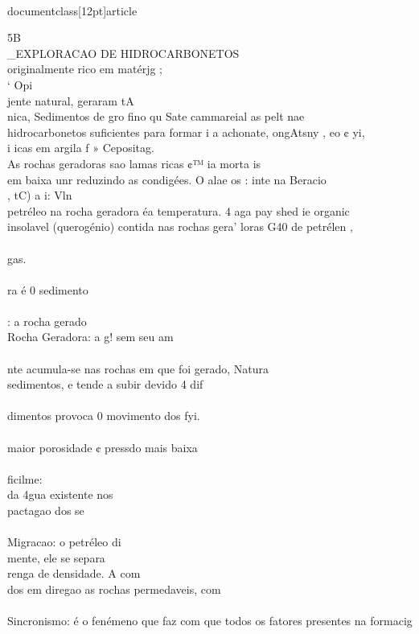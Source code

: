 \\documentclass[12pt]{article}
\begin{document}
{5B \\_EXPLORACAO DE HIDROCARBONETOS\\
originalmente rico em matérjg ;\\
‘ Opi\\
jente natural, geraram tA\\
nica, Sedimentos de gro fino qu Sate cammareial as pelt nae\\
hidrocarbonetos suficientes para formar i a achonate, ongAtsny , eo ¢ yi,\\
i icas em argila f » Cepositag.\\
As rochas geradoras sao lamas ricas ¢™ ia morta is\\
em baixa unr reduzindo as condigées. O alae os : inte na Beracio\\
, tC) a i: Vln\\
petréleo na rocha geradora éa temperatura. 4 aga pay shed ie organic\\
insolavel (querogénio) contida nas rochas gera' loras G40 de petrélen ,\\
\\
gas.\\
\\
ra é 0 sedimento\\
\\
: a rocha gerado\\
Rocha Geradora: a g! sem seu am\\
\\
nte acumula-se nas rochas em que foi gerado, Natura\\
sedimentos, e tende a subir devido 4 dif\\
\\
dimentos provoca 0 movimento dos fyi.\\
\\
maior porosidade ¢ pressdo mais baixa\\
\\
ficilme:\\
da 4gua existente nos\\
pactagao dos se\\
\\
Migracao: o petréleo di\\
mente, ele se separa\\
renga de densidade. A com\\
dos em diregao as rochas permedaveis, com\\
\\
Sincronismo: é o fenémeno que faz com que todos os fatores presentes na formacig\\
}
\end{document}
